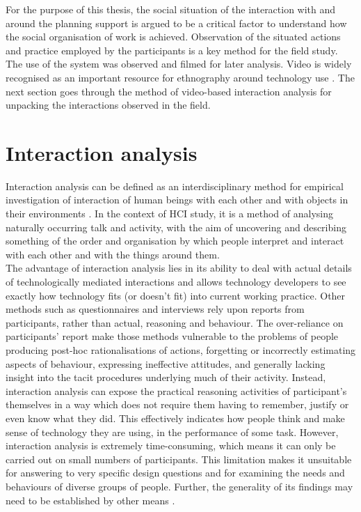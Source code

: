 For the purpose of this thesis, the social situation of the interaction with and around the planning support is argued to be a critical factor to understand how the social organisation of work is achieved. Observation of the situated actions and practice employed by the participants is a key method for the field study. The use of the system was observed and filmed for later analysis. Video is widely recognised as an important resource for ethnography around technology use \citep{Crabtree2012}. The next section goes through the method of video-based interaction analysis for unpacking the interactions observed in the field. \\

\section{Interaction analysis} \label{sec:aprIA}
Interaction analysis can be defined as an interdisciplinary method for empirical investigation of interaction of human beings with each other and with objects in their environments \citep{Jordan1995}. In the context of \ac{HCI} study, it is a method of analysing naturally occurring talk and activity, with the aim of uncovering and describing something of the order and organisation by which people interpret and interact with each other and with the things around them.\\

The advantage of interaction analysis lies in its ability to deal with actual details of technologically mediated interactions and allows technology developers to see exactly how technology fits (or doesn't fit) into current working practice. Other methods such as questionnaires and interviews rely upon reports from participants, rather than actual, reasoning and behaviour. The over-reliance on participants' report make those methods vulnerable to the problems of people producing post-hoc rationalisations of actions, forgetting or incorrectly estimating aspects of behaviour, expressing ineffective attitudes, and generally lacking insight into the tacit procedures underlying much of their activity. Instead, interaction analysis can expose the practical reasoning activities of participant's themselves in a way which does not require them having to remember, justify or even know what they did. This effectively indicates how people think and make sense of technology they are using, in the performance of some task. However, interaction analysis is extremely time-consuming, which means it can only be carried out on small numbers of participants. This limitation makes it unsuitable for answering to very specific design questions and for examining the needs and behaviours of diverse groups of people. Further, the generality of its findings may need to be established by other means \citep{Jordan1995}.\\

